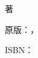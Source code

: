\begin{titlepage}
  \centering
  \vspace*{0.18\textheight}

  {\Huge\bfseries \TAPLChineseTitle\par}
  \vspace{1.5em}
  {\Large\itshape \TAPLOriginalTitle\par}

  \vspace{3em}
  {\Large \TAPLOriginalAuthor\quad 著\par}

  \vfill
  {\normalsize 原版：\TAPLPublisher，\TAPLPublicationYear\par}
  \vspace{0.4em}
  {\normalsize ISBN：\TAPLISBN\par}
  \vspace{0.08\textheight}
\end{titlepage}

